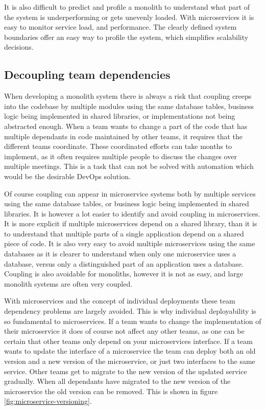 \documentclass[a4paper]{article}
\begin{document}
It is also difficult to predict and profile a monolith to understand what part of the system is underperforming or gets unevenly loaded. With microservices it is easy to monitor service load, and performance. The clearly defined system boundaries offer an easy way to profile the system, which simplifies scalability decisions.

\subsection{Decoupling team dependencies}
\label{sec:benefits:team-dependencies}
When developing a monolith system there is always a risk that coupling creeps into the codebase by multiple modules using the same database tables, business logic being implemented in shared libraries, or implementations not being abstracted enough. When a team wants to change a part of the code that has multiple dependants in code maintained by other teams, it requires that the different teams coordinate. These coordinated efforts can take months to implement, as it often requires multiple people to discuss the changes over multiple meetings. This is a task that can not be solved with automation which would be the desirable DevOps solution.

Of course coupling can appear in microservice systems both by multiple services using the same database tables, or business logic being implemented in shared libraries. It is however a lot easier to identify and avoid coupling in microservices. It is more explicit if multiple microservices depend on a shared library, than it is to understand that multiple parts of a single application depend on a shared piece of code. It is also very easy to avoid multiple microservices using the same databases as it is clearer to understand when only one microservice uses a database, versus only a distinguished part of an application uses a database. Coupling is also avoidable for monoliths, however it is not as easy, and large monolith systems are often very coupled.

With microservices and the concept of individual deployments these team dependency problems are largely avoided. This is why individual deployability is so fundamental to microservices. If a team wants to change the implementation of their microservice it does of course not affect any other teams, as one can be certain that other teams only depend on your microservices interface. If a team wants to update the interface of a microservice the team can deploy both an old version and a new version of the microservice, or just two interfaces to the same service. Other teams get to migrate to the new version of the updated service gradually. When all dependants have migrated to the new version of the microservice the old version can be removed. This is shown in figure \ref{fig:microservice-versioning}.
\end{document}
